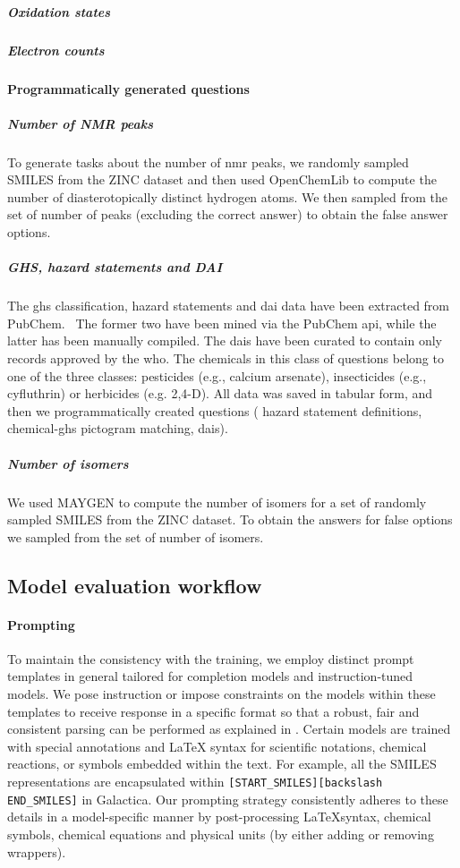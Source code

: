 \documentclass[11pt, oneside]{article}
\begin{document}
\subparagraph{Oxidation states}

\subparagraph{Electron counts}

\paragraph{Programmatically generated questions}
\subparagraph{Number of NMR peaks} To generate tasks about the number of \gls{nmr} peaks, we randomly sampled SMILES from the ZINC dataset and then used OpenChemLib\cite{openchemlib} to compute the number of diasterotopically distinct hydrogen atoms.
We then sampled from the set of number of peaks (excluding the correct answer) to obtain the false answer options.

\subparagraph{GHS, hazard statements and DAI}
The \gls{ghs} classification, hazard statements and \gls{dai} data have been extracted from PubChem.~\cite{pubchem}
The former two have been mined via the PubChem \gls{api}, while the latter has been manually compiled.
The \glspl{dai} have been curated to contain only records approved by the \gls{who}.
The chemicals in this class of questions belong to one of the three classes: pesticides (e.g., calcium arsenate), insecticides (e.g., cyfluthrin) or herbicides (e.g. 2,4-D).
All data was saved in tabular form, and then we programmatically created questions ( hazard statement definitions,  chemical-\gls{ghs} pictogram matching,  \glspl{dai}).


\subparagraph{Number of isomers}
We used MAYGEN\cite{Yirik_2021} to compute the number of isomers for a set of randomly sampled SMILES from the ZINC dataset.
To obtain the answers for false options we sampled from the set of number of isomers.

\subsection{Model evaluation workflow}

\paragraph{Prompting}

To maintain the consistency with the training, we employ distinct prompt templates in general tailored for completion models and instruction-tuned models. 
We pose instruction or impose constraints on the models within these templates to receive response in a specific format so that a robust, fair and consistent parsing can be performed as explained in .
Certain models are trained with special annotations and LaTeX syntax for scientific notations, chemical reactions, or symbols embedded within the text. 
For example, all the SMILES representations are encapsulated within \texttt{[START\_SMILES][\text backslash END\_SMILES]} in Galactica\cite{taylor2022galactica}.
Our prompting strategy consistently adheres to  these details in a model-specific manner by post-processing \LaTeX syntax, chemical symbols, chemical equations and physical units (by either adding or removing wrappers).
\end{document}
